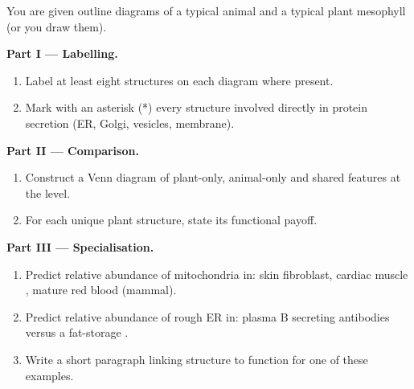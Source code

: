 \begin{problem}
\label{pb:g10:the-cell:1}
You are given outline diagrams of a typical animal  and a typical
plant mesophyll  (or you draw them).

\medskip
\noindent\textbf{Part I --- Labelling.}
\begin{enumerate}
  \item Label at least eight structures on each diagram where present.
  \item Mark with an asterisk (*) every structure involved directly in
        protein secretion (ER, Golgi, vesicles, membrane).
\end{enumerate}

\medskip
\noindent\textbf{Part II --- Comparison.}
\begin{enumerate}
  \item Construct a Venn diagram of plant-only, animal-only and shared
        features at the  level.
  \item For each unique plant structure, state its functional payoff.
\end{enumerate}

\medskip
\noindent\textbf{Part III --- Specialisation.}
\begin{enumerate}
  \item Predict relative abundance of mitochondria in: skin fibroblast,
        cardiac muscle , mature red blood  (mammal).
  \item Predict relative abundance of rough ER in: plasma B 
        secreting antibodies versus a fat-storage .
  \item Write a short paragraph linking structure to function for one
        of these examples.
\end{enumerate}
\end{problem}
